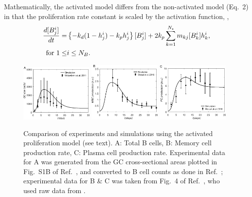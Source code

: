 Mathematically, the activated model differs from the non-activated model (Eq.~2) in that the proliferation rate constant
is scaled by the activation function, \ie,
\begin{equation}
 \begin{aligned}
 \frac{d {[B^i_j]}}{d {t}}=&\left\{-k_d(1-h^i_j) - k_p h^i_j\right\}[B^i_j] + 2k_p\sum^{N_\epsilon}_{k=1} m_{kj} [B^i_k]h^i_k,\\
  \textrm{for}\ 1\le& i\le N_B.
 \end{aligned}
 \label{eq:apam}
\end{equation}
\begin{figure}
\centering
\includegraphics[width=0.32\textwidth]{../figS10/gcsize.eps}
\includegraphics[width=0.32\textwidth]{../figS10/dmbc.eps}
\includegraphics[width=0.32\textwidth]{../figS10/dplc.eps}
\caption{Comparison of experiments and simulations using the activated proliferation model (see text).
A: Total B cells, B: Memory cell production rate, C: Plasma cell
production rate. Experimental data for A was generated from the GC
cross-sectional areas plotted in Fig.~S1B of Ref.~, and converted to B cell counts
as done in Ref.~;
experimental data for B \& C was taken from Fig.~4 of Ref.~, who
used raw data from \citet{weisel16}.
}
\label{fig:apvalid}
\end{figure}
